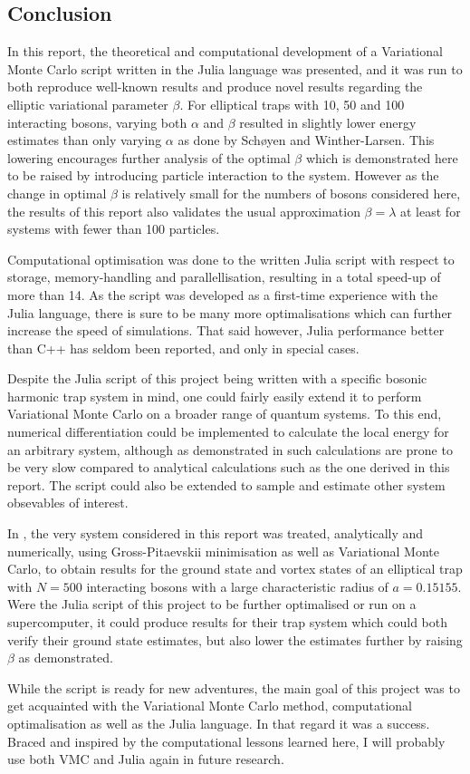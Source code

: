 \documentclass[a4paper,8pt]{article}
\begin{document}
\begin{multicols}{2}
\section{Conclusion}
In this report, the theoretical and computational development of a Variational Monte Carlo script written in the Julia language was presented, and it was run to both reproduce well-known results and produce novel results regarding the elliptic variational parameter $\beta$. For elliptical traps with 10, 50 and 100 interacting bosons, varying both $\alpha$ and $\beta$ resulted in slightly lower energy estimates than only varying $\alpha$ as done by Schøyen and Winther-Larsen. This lowering encourages further analysis of the optimal $\beta$ which is demonstrated here to be raised by introducing particle interaction to the system. However as the change in optimal $\beta$ is relatively small for the numbers of bosons considered here, the results of this report also validates the usual approximation ${\beta = \lambda}$ at least for systems with fewer than 100 particles.

Computational optimisation was done to the written Julia script with respect to storage, memory-handling and parallellisation, resulting in a total speed-up of more than 14. As the script was developed as a first-time experience with the Julia language, there is sure to be many more optimalisations which can further increase the speed of simulations. That said however, Julia performance better than C++ has seldom been reported, and only in special cases.

Despite the Julia script of this project being written with a specific bosonic harmonic trap system in mind, one could fairly easily extend it to perform Variational Monte Carlo on a broader range of quantum systems. To this end, numerical differentiation could be implemented to calculate the local energy for an arbitrary system, although as demonstrated in \cite{SWL} such calculations are prone to be very slow compared to analytical calculations such as the one derived in this report. The script could also be extended to sample and estimate other system obsevables of interest.

In \cite{NMPGHJP}, the very system considered in this report was treated, analytically and numerically, using Gross-Pitaevskii minimisation as well as Variational Monte Carlo, to obtain results for the ground state and vortex states of an elliptical trap with ${N = 500}$ interacting bosons with a large characteristic radius of ${a = 0.15155}$. Were the Julia script of this project to be further optimalised or run on a supercomputer, it could produce results for their trap system which could both verify their ground state estimates, but also lower the estimates further by raising $\beta$ as demonstrated.

While the script is ready for new adventures, the main goal of this project was to get acquainted with the Variational Monte Carlo method, computational optimalisation as well as the Julia language. In that regard it was a success. Braced and inspired by the computational lessons learned here, I will probably use both VMC and Julia again in future research.

\end{multicols}
\end{document}

